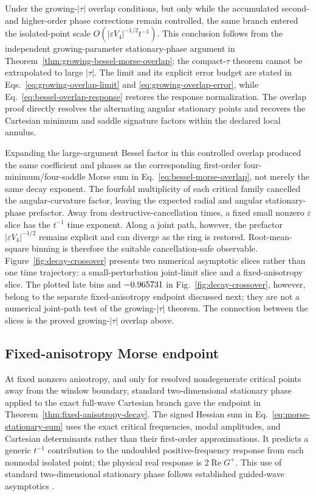 Under the growing-\(\lvert\tau\rvert\) overlap conditions, but only while the
accumulated second- and higher-order phase corrections remain controlled, the
same branch entered the isolated-point scale
\(O(\lvert\varepsilon V_4\rvert^{-1/2}t^{-1})\).  This conclusion follows from the
independent growing-parameter stationary-phase argument in
Theorem~\ref{thm:growing-bessel-morse-overlap}; the compact-\(\tau\) theorem
cannot be extrapolated to large \(\lvert\tau\rvert\).  The limit and its
explicit error budget are stated in Eqs.~\eqref{eq:growing-overlap-limit}
and \eqref{eq:growing-overlap-error}, while
Eq.~\eqref{eq:bessel-overlap-response} restores the response normalization.
The overlap proof
directly resolves the alternating angular stationary points and recovers the
Cartesian minimum and saddle signature factors within the declared local
annulus.

Expanding the large-argument Bessel factor in this controlled overlap produced
the same coefficient and phases as the corresponding first-order
four-minimum/four-saddle Morse sum in
Eq.~\eqref{eq:bessel-morse-overlap}, not
merely the same decay exponent.  The fourfold multiplicity of each critical
family cancelled the angular-curvature factor, leaving the expected radial and
angular stationary-phase prefactor.  Away from destructive-cancellation times,
a fixed small nonzero \(\varepsilon\) slice has the \(t^{-1}\) time exponent.
Along a joint path, however, the prefactor
\(\lvert\varepsilon V_4\rvert^{-1/2}\) remains explicit and can diverge as the
ring is restored.  Root-mean-square binning is therefore the suitable
cancellation-safe observable.  Figure~\ref{fig:decay-crossover} presents two
numerical asymptotic slices rather than one time trajectory: a
small-perturbation joint-limit slice and a fixed-anisotropy slice.  The plotted
late bins and
\(-0.965731\) in Fig.~\ref{fig:decay-crossover}, however, belong to the
separate fixed-anisotropy endpoint discussed next; they are not a numerical
joint-path test of the growing-\(\lvert\tau\rvert\) theorem.  The connection
between the slices is the proved growing-\(\lvert\tau\rvert\) overlap above.

\subsection{Fixed-anisotropy Morse endpoint}

At fixed nonzero anisotropy, and only for resolved nondegenerate critical
points away from the window boundary, standard two-dimensional stationary
phase applied to the exact full-wave Cartesian branch gave the endpoint in
Theorem~\ref{thm:fixed-anisotropy-decay}.  The signed Hessian sum in
Eq.~\eqref{eq:morse-stationary-sum} uses the exact critical frequencies,
modal amplitudes, and Cartesian determinants rather than their first-order
approximations.  It predicts a generic \(t^{-1}\) contribution to the
undoubled positive-frequency response from each nonnodal isolated point; the
physical real response is \(2\operatorname{Re}G^{+}\).  This use of standard
two-dimensional stationary phase follows established guided-wave asymptotics
\citep{velichko2007excitation,chapuis2010focusing,karmazin2013caustics}.

